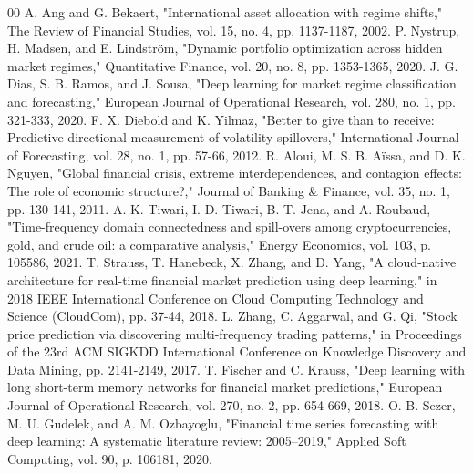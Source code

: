\documentclass[conference]{IEEEtran}
\begin{document}
\begin{thebibliography}{00}
 A. Ang and G. Bekaert, "International asset allocation with regime shifts," The Review of Financial Studies, vol. 15, no. 4, pp. 1137-1187, 2002.
 P. Nystrup, H. Madsen, and E. Lindström, "Dynamic portfolio optimization across hidden market regimes," Quantitative Finance, vol. 20, no. 8, pp. 1353-1365, 2020.
 J. G. Dias, S. B. Ramos, and J. Sousa, "Deep learning for market regime classification and forecasting," European Journal of Operational Research, vol. 280, no. 1, pp. 321-333, 2020.
 F. X. Diebold and K. Yilmaz, "Better to give than to receive: Predictive directional measurement of volatility spillovers," International Journal of Forecasting, vol. 28, no. 1, pp. 57-66, 2012.
 R. Aloui, M. S. B. Aïssa, and D. K. Nguyen, "Global financial crisis, extreme interdependences, and contagion effects: The role of economic structure?," Journal of Banking \& Finance, vol. 35, no. 1, pp. 130-141, 2011.
 A. K. Tiwari, I. D. Tiwari, B. T. Jena, and A. Roubaud, "Time-frequency domain connectedness and spill-overs among cryptocurrencies, gold, and crude oil: a comparative analysis," Energy Economics, vol. 103, p. 105586, 2021.
 T. Strauss, T. Hanebeck, X. Zhang, and D. Yang, "A cloud-native architecture for real-time financial market prediction using deep learning," in 2018 IEEE International Conference on Cloud Computing Technology and Science (CloudCom), pp. 37-44, 2018.
 L. Zhang, C. Aggarwal, and G. Qi, "Stock price prediction via discovering multi-frequency trading patterns," in Proceedings of the 23rd ACM SIGKDD International Conference on Knowledge Discovery and Data Mining, pp. 2141-2149, 2017.
 T. Fischer and C. Krauss, "Deep learning with long short-term memory networks for financial market predictions," European Journal of Operational Research, vol. 270, no. 2, pp. 654-669, 2018.
 O. B. Sezer, M. U. Gudelek, and A. M. Ozbayoglu, "Financial time series forecasting with deep learning: A systematic literature review: 2005–2019," Applied Soft Computing, vol. 90, p. 106181, 2020.
\end{thebibliography}
\end{document}
